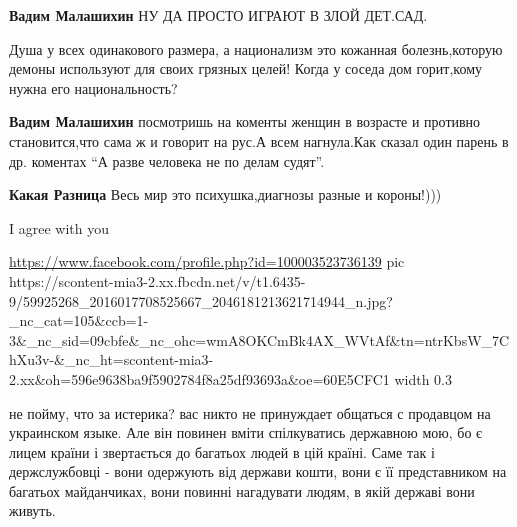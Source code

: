 \begin{itemize}
\textbf{Вадим Малашихин} НУ ДА ПРОСТО ИГРАЮТ В ЗЛОЙ ДЕТ.САД.

Душа у всех одинакового размера, а национализм это кожанная болезнь,которую демоны используют для своих грязных целей! Когда у соседа дом горит,кому нужна его национальность?

\textbf{Вадим Малашихин} посмотришь на коменты женщин в возрасте и противно
становится,что сама ж и говорит на рус.А всем нагнула.Как сказал один парень в
др. коментах \enquote{А разве человека не по делам судят}.

\textbf{Какая Разница} Весь мир это психушка,диагнозы разные и короны!)))
\end{itemize}

I agree with you

\url{https://www.facebook.com/profile.php?id=100003523736139}
\ifcmt
  pic https://scontent-mia3-2.xx.fbcdn.net/v/t1.6435-9/59925268_2016017708525667_2046181213621714944_n.jpg?_nc_cat=105&ccb=1-3&_nc_sid=09cbfe&_nc_ohc=wmA8OKCmBk4AX_WVtAf&tn=ntrKbsW_7ChXu3v-&_nc_ht=scontent-mia3-2.xx&oh=596e9638ba9f5902784f8a25df93693a&oe=60E5CFC1
  width 0.3
\fi

не пойму, что за истерика? вас никто не принуждает общаться с продавцом на
украинском языке. Але він повинен вміти спілкуватись державною мою, бо є лицем
країни і звертається до багатьох людей в цій країні. Саме так і держслужбовці -
вони одержують від держави кошти, вони є її представником на багатьох
майданчиках, вони повинні нагадувати людям, в якій державі вони живуть.

